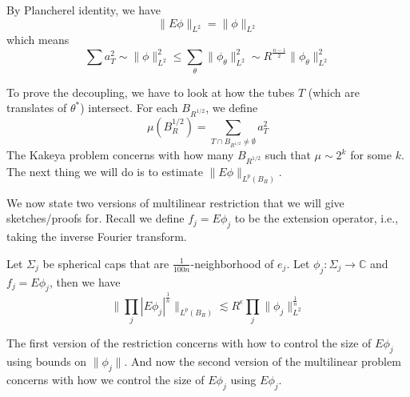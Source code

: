 By Plancherel identity, we have
\begin{equation*}
    \|E\phi\|_{L^2}=\|\phi\|_{L^2}
\end{equation*}
which means
\begin{equation*}
    \sum a_T^2\sim\|\phi\|_{L^2}^2\leq\sum_\theta\|\phi_\theta\|_{L^2}^2\sim R^{\frac{n-1}{2}}\|\phi_\theta\|_{L^2}^2
\end{equation*}

To prove the decoupling, we have to look at how the tubes $T$ (which are translates of $\theta^*$) intersect. For each $B_{R^{1/2}}$, we define
\begin{equation*}
    \mu(B_R^{1/2})=\sum_{T\cap B_{R^{1/2}}\neq\emptyset}a_T^2
\end{equation*}
The Kakeya problem concerns with how many $B_{R^{1/2}}$ such that $\mu\sim 2^k$ for some $k$. The next thing we will do is to estimate $\|E\phi\|_{L^p(B_R)}$.

We now state two versions of multilinear restriction that we will give sketches/proofs for. Recall we define $f_j=E\phi_j$ to be the extension operator, i.e., taking the inverse Fourier transform.
\begin{theorem}
    Let $\Sigma_j$ be spherical caps that are $\frac{1}{100n}$-neighborhood of $e_j$. Let $\phi_j:\Sigma_j\to\mathbb{C}$ and $f_j=E\phi_j$, then we have
    \begin{equation*}
        \|\prod_j|E\phi_j|^{\frac{1}{n}} \|_{L^p(B_R)}\lesssim R^\epsilon\prod_j\|\phi_j\|_{L^2}^{\frac{1}{n}}
    \end{equation*}
\end{theorem}
The first version of the restriction concerns with how to control the size of $E\phi_j$ using bounds on $\|\phi_j\|$. And now the second version of the multilinear problem concerns with how we control the size of $E\phi_j$ using $E\phi_j$.

